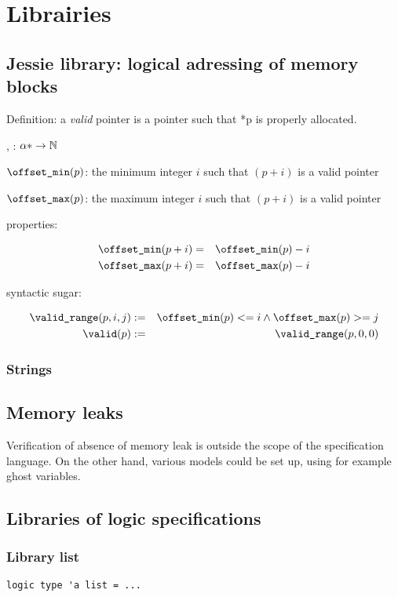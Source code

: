 \chapter{Librairies}
\label{chap:lib}

\section{Jessie library: logical adressing of memory blocks}

Definition: a \emph{valid} pointer is a pointer such that *p is properly
allocated.

\offsetmin, \offsetmax : $\alpha * \rightarrow \mathbb{N}$

$\texttt{{\textbackslash}offset\_min}(p)$: the minimum integer $i$ such that $(p+i)$ is a valid
pointer

$\texttt{{\textbackslash}offset\_max}(p)$: the maximum integer $i$ such that $(p+i)$ is a valid
pointer

properties:

\begin{eqnarray*}
\texttt{{\textbackslash}offset\_min}(p+i) &=& \texttt{{\textbackslash}offset\_min}(p)-i \\
\texttt{{\textbackslash}offset\_max}(p+i) &=& \texttt{{\textbackslash}offset\_max}(p)-i
\end{eqnarray*}

syntactic sugar:

\begin{eqnarray*}
\texttt{{\textbackslash}valid\_range}(p,i,j) &:=& \texttt{{\textbackslash}offset\_min}(p) <= i \land \texttt{{\textbackslash}offset\_max}(p) >= j \\
\texttt{{\textbackslash}valid}(p) &:=& \texttt{{\textbackslash}valid\_range}(p,0,0) 
\end{eqnarray*}


\subsection{Strings}

\strlen


\section{Memory leaks}

\experimental

Verification of absence of memory leak is outside the scope of the
specification language. On the other hand, various models could be set
up, using for example ghost variables.


\section{Libraries of logic specifications}
\label{sec:speclibraries}

\subsection{Library list}

\begin{verbatim}
logic type 'a list = ...
\end{verbatim}

